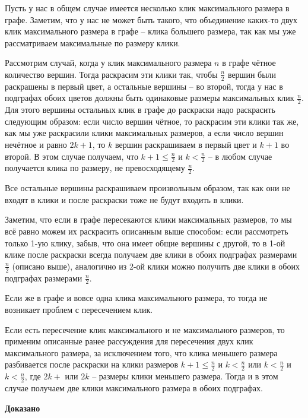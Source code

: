 \documentclass[a4paper,12pt]{article} %
\begin{document}
Пусть у нас в общем случае имеется несколько клик максимального размера в графе. Заметим, что у нас не может быть такого, что объединение каких-то двух клик максимального размера в графе -- клика большего размера, так как мы уже рассматриваем максимальные по размеру клики.

Рассмотрим случай, когда у клик максимального размера $n$ в графе чётное количество вершин. Тогда раскрасим эти клики так, чтобы $\frac{n}{2}$ вершин были раскрашены в первый цвет, а остальные вершины -- во второй, тогда у нас в подграфах обоих цветов должны быть одинаковые размеры максимальных клик $\frac{n}{2}$. Для этого вершины остальных клик в графе до раскраски надо раскрасить следующим образом: если число вершин чётное, то раскрасим эти клики так же, как мы уже раскрасили клики максимальных размеров, а если число вершин нечётное и равно $2k + 1$, то $k$ вершин раскрашиваем в первый цвет и $k+1$ во второй. В этом случае получаем, что $k+1 \leqslant \frac{n}{2}$ и $k < \frac{n}{2}$ -- в любом случае получается клика по размеру, не превосходящему $\frac{n}{2}$. 

Все остальные вершины раскрашиваем произвольным образом, так как они не входят в клики и после раскраски тоже не будут входить в клики.

Заметим, что если в графе пересекаются клики максимальных размеров, то мы всё равно можем их раскрасить описанным выше способом: если рассмотреть только 1-ую клику, забыв, что она имеет общие вершины с другой, то в 1-ой клике после раскраски всегда получаем две клики в обоих подграфах размерами $\frac{n}{2}$ (описано выше), аналогично из 2-ой клики можно получить две клики в обоих подграфах размерами $\frac{n}{2}$.

Если же в графе и вовсе одна клика максимального размера, то тогда не возникает проблем с пересечением клик.

Если есть пересечение клик максимального и не максимального размеров, то применим описанные ранее рассуждения для пересечения двух клик максимального размера, за исключением того, что клика меньшего размера разбивается после раскраски на клики размеров $k+1 \leqslant \frac{n}{2}$ и $k < \frac{n}{2}$ или $k < \frac{n}{2}$ и $k < \frac{n}{2}$, где $2k+$ или $2k$ -- размеры клики меньшего размера. Тогда и в этом случае получаем две клики максимального размера в обоих подграфах.

\begin{flushright}
\begin{large}
\textbf {Доказано}
\end{large}
\end{flushright}
\end{document}
